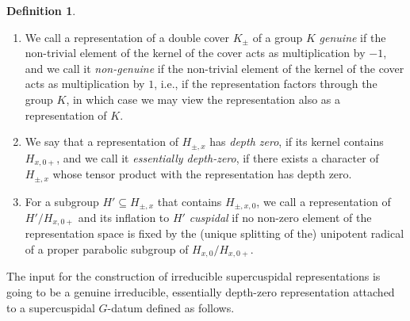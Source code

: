 \documentclass{article}
\theoremstyle{definition}
\newtheorem{dfn}[thm]{Definition}
\numberwithin{equation}{subsection}
\renewcommand{\-}{\hyp{}}
\begin{document}
\begin{dfn} \label{def:cuspidal} \ \\[-18pt]
	\begin{enumerate}
		\item We call a representation of a double cover $K_{\pm}$ of a group $K$ \emph{genuine} if the non-trivial element of the kernel of the cover acts as multiplication by $-1$, and we call it \emph{non-genuine} if the non-trivial element of the kernel of the cover acts as multiplication by $1$, i.e., if the representation factors through the group $K$, in which case we may view the representation also as a representation of $K$. \item We say that a representation of $H_{\pm,x}$ has \emph{depth zero}, if its kernel contains $H_{x,0+}$, and we call it \emph{essentially depth-zero}, if there exists a character of $H_{\pm,x}$ whose tensor product with the representation has depth zero. 
		\item For a subgroup $H' \subseteq H_{\pm, x}$ that contains $H_{\pm, x,0}$, we call a representation of $H'/H_{x,0+}$ and its inflation to $H'$ \emph{cuspidal} if no non-zero element of the representation space is fixed by the (unique splitting of the) unipotent radical of a proper parabolic subgroup of $H_{x,0}/H_{x,0+}$. 
\end{enumerate}	 
\end{dfn}


The input for the construction of irreducible supercuspidal representations is going to be a genuine irreducible, essentially depth-zero representation attached to a supercuspidal $G$-datum defined as follows.
\end{document}
